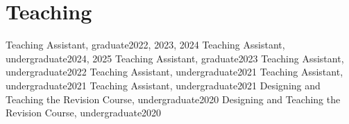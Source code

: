 \documentclass[a4paper,20pt]{article}
\begin{document}
\section{Teaching}
  \resumeSubHeadingListStart
    {Teaching Assistant, graduate}{2022, 2023, 2024}
    \vspace{-5pt}
    {Teaching Assistant, undergraduate}{2024, 2025}
    \vspace{-5pt}
    {Teaching Assistant, graduate}{2023}
    \vspace{-5pt}
    {Teaching Assistant, undergraduate}{2022}
    \vspace{-5pt}
    {Teaching Assistant, undergraduate}{2021}
    \vspace{-5pt}
    {Teaching Assistant, undergraduate}{2021}
    \vspace{-5pt}
    {Teaching Assistant, undergraduate}{2021}
    \vspace{-5pt}
    {Designing and Teaching the Revision Course, undergraduate}{2020}
    \vspace{-5pt}
    {Designing and Teaching the Revision Course, undergraduate}{2020}
\resumeSubHeadingListEnd

\end{document}
